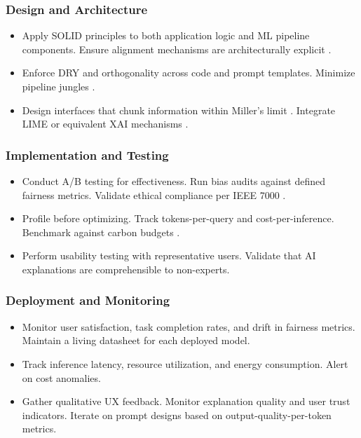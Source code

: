 \documentclass[11pt,a4paper]{article}
\begin{document}
\subsubsection{Design and Architecture}

\begin{itemize}[leftmargin=2em]
    \item[\textbf{E1}] Apply SOLID principles \cite{martin2017clean} to both application logic and ML pipeline components. Ensure alignment mechanisms are architecturally explicit \cite{russell2019human}.
    \item[\textbf{E2}] Enforce DRY and orthogonality \cite{hunt1999pragmatic} across code and prompt templates. Minimize pipeline jungles \cite{sculley2015hidden}.
    \item[\textbf{E3}] Design interfaces that chunk information within Miller's limit \cite{miller1956magical}. Integrate LIME or equivalent XAI mechanisms \cite{ribeiro2016should}.
\end{itemize}

\subsubsection{Implementation and Testing}

\begin{itemize}[leftmargin=2em]
    \item[\textbf{E1}] Conduct A/B testing for effectiveness. Run bias audits against defined fairness metrics. Validate ethical compliance per IEEE 7000 \cite{ieee7000:2021}.
    \item[\textbf{E2}] Profile before optimizing. Track tokens-per-query and cost-per-inference. Benchmark against carbon budgets \cite{patterson2021carbon}.
    \item[\textbf{E3}] Perform usability testing with representative users. Validate that AI explanations are comprehensible to non-experts.
\end{itemize}

\subsubsection{Deployment and Monitoring}

\begin{itemize}[leftmargin=2em]
    \item[\textbf{E1}] Monitor user satisfaction, task completion rates, and drift in fairness metrics. Maintain a living datasheet for each deployed model.
    \item[\textbf{E2}] Track inference latency, resource utilization, and energy consumption. Alert on cost anomalies.
    \item[\textbf{E3}] Gather qualitative UX feedback. Monitor explanation quality and user trust indicators. Iterate on prompt designs based on output-quality-per-token metrics.
\end{itemize}
\end{document}
